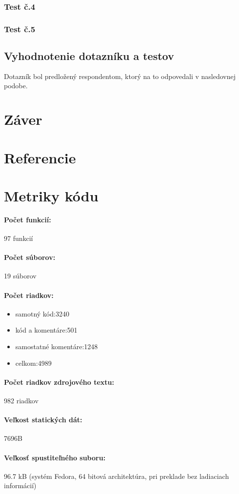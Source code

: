 \documentclass[12pt,a4paper,titlepage,final]{article}
\begin{document}
\subsubsection{Test č.4}


\subsubsection{Test č.5}


\subsection{Vyhodnotenie dotazníku a testov}

Dotazník bol predložený respondentom, ktorý na to odpovedali v nasledovnej podobe. 


\section{Záver}

\section{Referencie}





\newpage
\section{Metriky kódu}

\paragraph{Počet funkcií:} 97 funkcií
\paragraph{Počet súborov:} 19 súborov
\paragraph{Počet riadkov:}
\begin{itemize}
\item	  samotný kód:3240
\item	  kód a komentáre:501
\item	  samostatné komentáre:1248
\item	  celkom:4989
\end{itemize}
\paragraph{Počet riadkov zdrojového textu:} 982  riadkov
\paragraph{Veľkost statických dát:} 7696B
\paragraph{Veľkosť spustiteľného suboru:} 96.7 kB (systém Fedora, 64 bitová
architektúra, pri preklade bez ladiaciach informácií)

\newpage 
\end{document}
